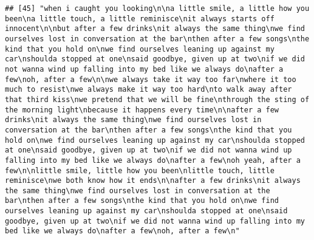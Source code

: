 \documentclass[]{article}
\begin{document}
\begin{verbatim}
## [45] "when i caught you looking\n\na little smile, a little how you been\na little touch, a little reminisce\nit always starts off innocent\n\nbut after a few drinks\nit always the same thing\nwe find ourselves lost in conversation at the bar\nthen after a few songs\nthe kind that you hold on\nwe find ourselves leaning up against my car\nshoulda stopped at one\nsaid goodbye, given up at two\nif we did not wanna wind up falling into my bed like we always do\nafter a few\noh, after a few\n\nwe always take it way too far\nwhere it too much to resist\nwe always make it way too hard\nto walk away after that third kiss\nwe pretend that we will be fine\nthrough the sting of the morning light\nbecause it happens every time\n\nafter a few drinks\nit always the same thing\nwe find ourselves lost in conversation at the bar\nthen after a few songs\nthe kind that you hold on\nwe find ourselves leaning up against my car\nshoulda stopped at one\nsaid goodbye, given up at two\nif we did not wanna wind up falling into my bed like we always do\nafter a few\noh yeah, after a few\n\nlittle smile, little how you been\nlittle touch, little reminisce\nwe both know how it ends\n\nafter a few drinks\nit always the same thing\nwe find ourselves lost in conversation at the bar\nthen after a few songs\nthe kind that you hold on\nwe find ourselves leaning up against my car\nshoulda stopped at one\nsaid goodbye, given up at two\nif we did not wanna wind up falling into my bed like we always do\nafter a few\noh, after a few\n"                                                                                                                                                                                                                                                                                                                                                                                                                                                                                                                                                                                                                                                                                                                                                                                                                                                                                                                                                                                                                                                                                                                                                                                                                                                                                                                                                                                                       

\end{verbatim}
\end{document}

